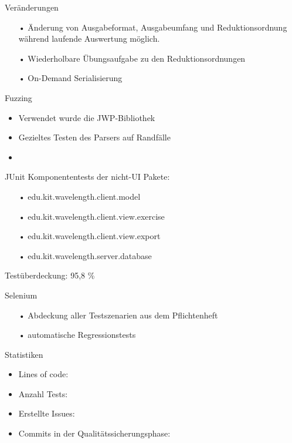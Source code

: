 \documentclass[10pt]{beamer}
\begin{document}
\begin{frame}{Veränderungen}
\begin{itemize}
\item[•] Änderung von Ausgabeformat, Ausgabeumfang und Reduktionsordnung während laufende Auswertung möglich.
\item[•] Wiederholbare Übungsaufgabe zu den Reduktionsordnungen
\item[•] On-Demand Serialisierung
\end{itemize}
\end{frame}

\begin{frame}{Fuzzing}
\begin{itemize}
	\item Verwendet wurde die JWP-Bibliothek
	\item Gezieltes Testen des Parsers auf Randfälle
	\item 
\end{itemize}

\end{frame}

\begin{frame}{JUnit}
Komponententests der nicht-UI Pakete:
\begin{itemize}
\item[•] edu.kit.wavelength.client.model
\item[•] edu.kit.wavelength.client.view.exercise
\item[•] edu.kit.wavelength.client.view.export
\item[•] edu.kit.wavelength.server.database
\end{itemize}
Testüberdeckung: 95,8 \%
\end{frame}



\begin{frame}{Selenium}
\begin{itemize}
\item[•] Abdeckung aller Testszenarien aus dem Pflichtenheft
\item[•] automatische Regressionstests
\end{itemize}
\end{frame}

\begin{frame}{Statistiken} %
\begin{itemize}
\item Lines of code:
\item Anzahl Tests:
\item Erstellte Issues:
\item Commits in der Qualitätssicherungsphase:
\end{itemize}
\end{frame}
\end{document}
